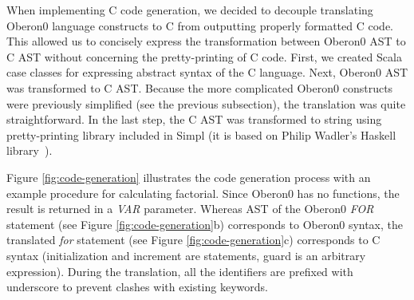 When implementing C code generation, we decided to decouple translating
Oberon0 language constructs to C from outputting properly formatted
C code. This allowed us to concisely express the transformation between
Oberon0 AST to C AST without concerning the pretty-printing of C code.
First, we created Scala case classes for expressing abstract syntax
of the C language. Next, Oberon0 AST was transformed to C AST. Because
the more complicated Oberon0 constructs were previously simplified
(see the previous subsection), the translation was quite straightforward.
In the last step, the C AST was transformed to string using pretty-printing
library included in Simpl (it is based on Philip Wadler's Haskell
library~\cite{wadler-prettyprinter}).

Figure \ref{fig:code-generation} illustrates the code generation
process with an example procedure for calculating factorial. Since
Oberon0 has no functions, the result is returned in a \emph{VAR} parameter.
Whereas AST of the Oberon0 \emph{FOR} statement (see Figure \ref{fig:code-generation}b)
corresponds to Oberon0 syntax, the translated \emph{for} statement
(see Figure \ref{fig:code-generation}c) corresponds to C syntax (initialization
and increment are statements, guard is an arbitrary expression). During
the translation, all the identifiers are prefixed with underscore
to prevent clashes with existing keywords.

